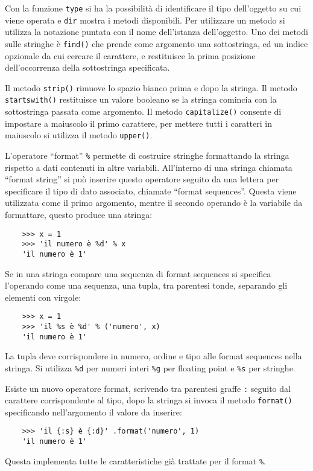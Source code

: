 \documentclass{article}
\numberwithin{equation}{subsection}
\begin{document}
Con la funzione \verb|type| si ha la possibilità di identificare il tipo dell'oggetto su cui viene operata e \verb|dir| mostra i metodi disponibili. 
Per utilizzare un metodo si utilizza la notazione puntata con il nome dell'istanza dell'oggetto. 
Uno dei metodi sulle stringhe è \verb|find()| che prende come argomento una sottostringa, ed un indice opzionale da cui cercare il carattere, e restituisce la prima 
posizione dell'occorrenza della sottostringa specificata. 

Il metodo \verb|strip()| rimuove lo spazio bianco prima e dopo la stringa. Il metodo \verb|startswith()| restituisce un valore booleano se la stringa comincia 
con la sottostringa passata come argomento. Il metodo \verb|capitalize()| consente di impostare a maiuscolo il primo carattere, per mettere tutti i caratteri in 
maiuscolo si utilizza il metodo \verb|upper()|. 

L'operatore ``format'' \verb|%| permette di costruire stringhe formattando la stringa rispetto a dati contenuti in altre variabili. All'interno di una stringa 
chiamata ``format string'' si può inserire questo operatore seguito da una lettera per specificare il tipo di dato associato, chiamate ``format sequences''. Questa 
viene utilizzata come il primo argomento, mentre il secondo operando è la variabile da formattare, questo produce una stringa:
\begin{verbatim}
    >>> x = 1
    >>> 'il numero è %d' % x
    'il numero è 1' 
\end{verbatim}

Se in una stringa compare una sequenza di format sequences si specifica l'operando come una sequenza, una tupla, tra parentesi tonde, separando gli elementi con virgole:
\begin{verbatim}
    >>> x = 1
    >>> 'il %s è %d' % ('numero', x)
    'il numero è 1' 
\end{verbatim}
La tupla deve corrispondere in numero, ordine e tipo alle format sequences nella stringa. 
Si utilizza \verb|%d| per numeri interi \verb|%g| per floating point e \verb|%s| per stringhe. 

Esiste un nuovo operatore format, scrivendo tra parentesi graffe \verb|:| seguito dal carattere corrispondente al tipo, dopo la stringa si invoca il metodo \verb|format()| 
specificando nell'argomento il valore da inserire:
\begin{verbatim}
    >>> 'il {:s} è {:d}' .format('numero', 1)
    'il numero è 1' 
\end{verbatim}
Questa implementa tutte le caratteristiche già trattate per il format \verb|%|. 
\end{document}

